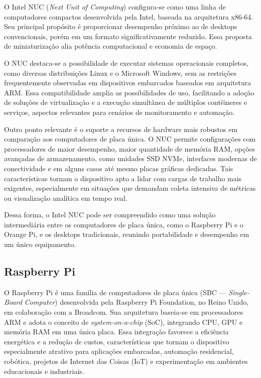 O Intel NUC (\textit{Next Unit of Computing}) configura-se como uma linha de computadores compactos desenvolvida pela Intel, baseada na arquitetura x86-64. Seu principal propósito é proporcionar desempenho próximo ao de desktops convencionais, porém em um formato significativamente reduzido. Essa proposta de miniaturização alia potência computacional e economia de espaço.

O NUC destaca-se a possibilidade de executar sistemas operacionais completos, como diversas distribuições Linux e o Microsoft Windows, sem as restrições frequentemente observadas em dispositivos embarcados baseados em arquitetura ARM. Essa compatibilidade amplia as possibilidades de uso, facilitando a adoção de soluções de virtualização e a execução simultânea de múltiplos contêineres e serviços, aspectos relevantes para cenários de monitoramento e automação.

Outro ponto relevante é o suporte a recursos de hardware mais robustos em comparação aos computadores de placa única. O NUC permite configurações com processadores de maior desempenho, maior quantidade de memória RAM, opções avançadas de armazenamento, como unidades SSD NVMe, interfaces modernas de conectividade e em alguns casos até mesmo placas gráficas dedicadas. Tais características tornam o dispositivo apto a lidar com cargas de trabalho mais exigentes, especialmente em situações que demandam coleta intensiva de métricas ou visualização analítica em tempo real.

Dessa forma, o Intel NUC pode ser compreendido como uma solução intermediária entre os computadores de placa única, como o Raspberry Pi e o Orange Pi, e os desktops tradicionais, reunindo portabilidade e desempenho em um único equipamento.

\subsection{Raspberry Pi}

O Raspberry Pi é uma família de computadores de placa única (SBC — \textit{Single-Board Computer}) desenvolvida pela Raspberry Pi Foundation, no Reino Unido, em colaboração com a Broadcom. Sua arquitetura baseia-se em processadores ARM e adota o conceito de \textit{system-on-a-chip} (SoC), integrando CPU, GPU e memória RAM em uma única placa. Essa integração favorece a eficiência energética e a redução de custos, características que tornam o dispositivo especialmente atrativo para aplicações embarcadas, automação residencial, robótica, projetos de Internet das Coisas (IoT) e experimentação em ambientes educacionais e industriais.

